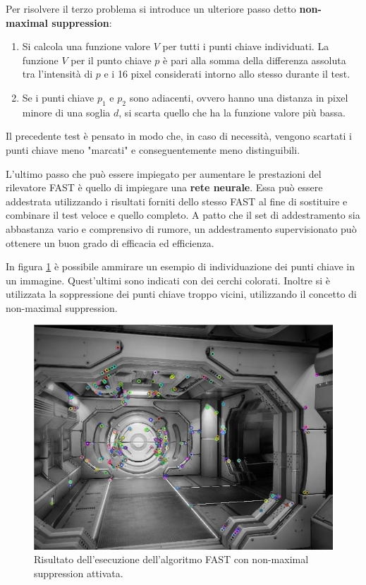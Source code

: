 Per risolvere il terzo problema si introduce un ulteriore passo detto \textbf{non-maximal suppression}:
\begin{enumerate}
	\item Si calcola una funzione valore $V$ per tutti i punti chiave individuati. La funzione $V$ per il punto chiave $p$ è pari alla somma della differenza assoluta tra l'intensità di $p$ e i 16 pixel considerati intorno allo stesso durante il test.
	\item Se i punti chiave $p_1$ e $p_2$ sono adiacenti, ovvero hanno una distanza in pixel minore di una soglia $d$, si scarta quello che ha la funzione valore più bassa.
\end{enumerate}
Il precedente test è pensato in modo che, in caso di necessità, vengono scartati i punti chiave meno "marcati" e conseguentemente meno distinguibili. 

L'ultimo passo che può essere impiegato per aumentare le prestazioni del rilevatore FAST è quello di impiegare una \textbf{rete neurale}. Essa può essere addestrata utilizzando i risultati forniti dello stesso FAST al fine di sostituire e combinare il test veloce e quello completo. A patto che il set di addestramento sia abbastanza vario e comprensivo di rumore, un addestramento supervisionato può ottenere un buon grado di efficacia ed efficienza. 

In figura \ref{vis:feature:detection} è possibile ammirare un esempio di individuazione dei punti chiave in un immagine. Quest'ultimi sono indicati con dei cerchi colorati. Inoltre si è utilizzata la soppressione dei punti chiave troppo vicini, utilizzando il concetto di non-maximal suppression.
\begin{figure}[h]
	\centering
	\includegraphics[width=420pt]{imgs/fdetection.jpg}
	\caption{Risultato dell'esecuzione dell'algoritmo FAST con non-maximal suppression attivata.}
	\label{vis:feature:detection}
\end{figure} 


